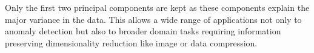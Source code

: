 Only the first two principal components are kept as these components explain the major variance in the data. This allows a wide range of applications not only to anomaly detection but also to broader domain tasks requiring information preserving dimensionality reduction like image or data compression.